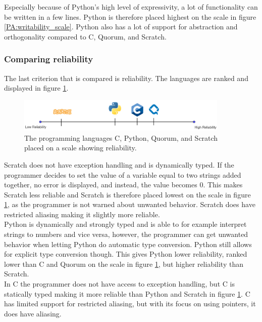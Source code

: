 Especially because of Python's high level of expressivity, a lot of functionality can be written in a few lines. Python is therefore placed highest on the scale in figure \ref{PA:writability_scale}. Python also has a lot of support for abstraction and orthogonality compared to C, Quorum, and Scratch.\\

\newpage
\subsubsection{Comparing reliability}
The last criterion that is compared is reliability. The languages are ranked and displayed in figure \ref{PA:reliability_scale}.

\begin{figure}[H] 
    \begin{center}
        \includegraphics[width=0.9\textwidth]{Files/Billeder: Analyse/Reliability.png}
    \end{center}
    \caption{The programming languages C, Python, Quorum, and Scratch placed on a scale showing reliability.}
    \label{PA:reliability_scale}
\end{figure}

Scratch does not have exception handling and is dynamically typed. If the programmer decides to set the value of a variable equal to two strings added together, no error is displayed, and instead, the value becomes 0. This makes Scratch less reliable and Scratch is therefore placed lowest on the scale in figure \ref{PA:reliability_scale}, as the programmer is not warned about unwanted behavior. Scratch does have restricted aliasing making it slightly more reliable.\\

Python is dynamically and strongly typed and is able to for example interpret strings to numbers and vice versa, however, the programmer can get unwanted behavior when letting Python do automatic type conversion. Python still allows for explicit type conversion though. This gives Python lower reliability, ranked lower than C and Quorum on the scale in figure \ref{PA:reliability_scale}, but higher reliability than Scratch.\\

In C the programmer does not have access to exception handling, but C is statically typed making it more reliable than Python and Scratch in figure \ref{PA:reliability_scale}. C has limited support for restricted aliasing, but with its focus on using pointers, it does have aliasing.\\

